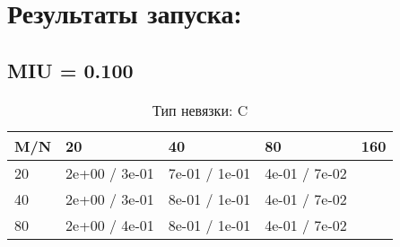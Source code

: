 \documentclass[a4paper,11pt]{article}
\begin{document}
\section{Результаты запуска:}
\subsection{MIU = 0.100}
\begin{table}[H]
\caption {Тип невязки: C   }
\begin{center}
\begin{tabular}{l|l|l|l|l}
\hline
M/N  & 20 & 40 & 80 & 160 \\ \hline
  20 & 2e+00 / 3e-01& 7e-01 / 1e-01& 4e-01 / 7e-02\\ \hline
  40 & 2e+00 / 3e-01& 8e-01 / 1e-01& 4e-01 / 7e-02\\ \hline
  80 & 2e+00 / 4e-01& 8e-01 / 1e-01& 4e-01 / 7e-02\\ \hline
\end{tabular}
\end{center}
\end{table}
\end{document}
